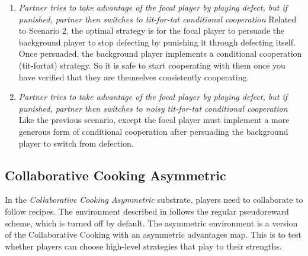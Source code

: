 \documentclass{article} %
\begin{document}
\begin{enumerate}
    \item[\textbf{SC8:}] \textit{Partner tries to take advantage of the focal
player by playing defect, but if punished, partner then switches to tit-for-tat conditional
cooperation} Related to Scenario 2, the optimal strategy is for the focal player to persuade the background player to stop defecting by punishing it through defecting itself.
Once persuaded, the background player implements a conditional cooperation (tit-fortat) strategy. So it is safe to start cooperating with them once you have verified that
they are themselves consistently cooperating.
    \item[\textbf{SC9:}] \textit{Partner tries to take advantage of the focal player by playing defect, but if punished, partner then switches to noisy tit-for-tat conditional cooperation}  Like the previous scenario, except the focal player must
implement a more generous form of conditional cooperation after persuading the
background player to switch from defection.

\end{enumerate}


\subsection{Collaborative Cooking Asymmetric}
In the \textit{Collaborative Cooking Asymmetric} substrate, players need to collaborate to follow recipes. The environment described in \citep{agapiou2022melting} follows the regular pseudoreward scheme, which is turned off by default. The asymmetric environment is a version of the Collaborative Cooking with an asymmetric
advantages map. This is to test whether players can choose high-level strategies that play to their strengths.
\end{document}
